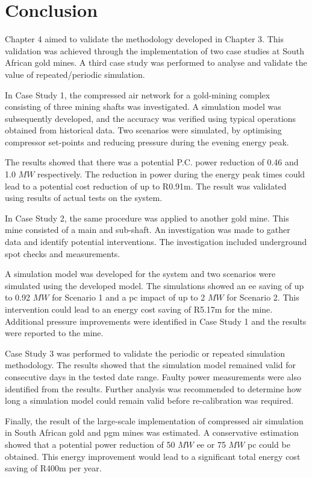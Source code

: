 \section{Conclusion}
Chapter 4 aimed to validate the methodology developed in Chapter 3. This validation was achieved through the implementation of two case studies at South African gold mines. A third case study was performed to analyse and validate the value of repeated/periodic simulation.
\par 
In Case Study 1, the compressed air network for a gold-mining complex consisting of three mining shafts was investigated. A simulation model was subsequently developed, and the accuracy was verified using typical operations obtained from historical data. Two scenarios were simulated, by optimising compressor set-points and reducing pressure during the evening energy peak.
\par 
The results showed that there was a potential P.C. power reduction of 0.46 and 1.0 $MW$ respectively. The reduction in power during the energy peak times could lead to a potential cost reduction of up to R0.91m. The result was validated using results of actual tests on the system.
\par
In Case Study 2, the same procedure was applied to another gold mine. This mine consisted of a main and sub-shaft. An investigation was made to gather data and identify potential interventions. The investigation included underground spot checks and measurements.
\par 
A simulation model was developed for the system and two scenarios were simulated using the developed model. The simulations showed an \gls{ee} saving of up to 0.92 $MW$ for Scenario 1 and a \gls{pc} impact of up to 2 $MW$ for Scenario 2. This intervention could lead to an energy cost saving of R5.17m for the mine. Additional pressure improvements were identified in Case Study 1 and the results were reported to the mine.
\par
\clearpage
Case Study 3 was performed to validate the periodic or repeated simulation methodology. The results showed that the simulation model remained valid for consecutive days in the tested date range. Faulty power measurements were also identified from the results. Further analysis was recommended to determine how long a simulation model could remain valid before re-calibration was required.
\par 
Finally, the result of the large-scale implementation of compressed air simulation in South African gold and \gls{pgm} mines was estimated. A conservative estimation showed that a potential power reduction of 50 $MW$ \gls{ee} or 75 $ MW $ \gls{pc} could be obtained. This energy improvement would lead to a significant total energy cost saving of R400m per year.
